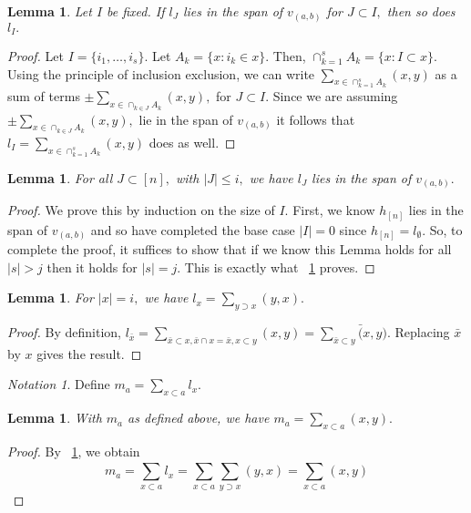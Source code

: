 \documentclass[10 pt]{amsart}
\theoremstyle{plain}
\newtheorem{lem}[thm]{Lemma}
\theoremstyle{definition}
\theoremstyle{remark}
\newtheorem{note}[thm]{Notation}
\numberwithin{equation}{section}
\begin{document}
\begin{lem}
\label{l_induction_step}
Let $I$ be fixed. If $l_J$ lies in the span of $v_{(a, b)}$ for $J \subset I,$ then so does $l_I.$

\end{lem}
\begin{proof}
Let $I = \{i_1,\ldots, i_s\}.$ Let $A_k = \{x \colon i_k \in x\}.$ Then, $\cap_{k=1}^s A_k = \{x \colon I \subset x\}.$ Using the principle of inclusion exclusion, we can write $\sum_{x \in\cap_{k=1}^s A_k} (x, y)$ as a sum of terms $\pm \sum_{x \in\cap_{k \in J} A_k} (x, y),$ for $J \subset I.$ Since we are assuming $\pm \sum_{x \in\cap_{k \in J} A_k} (x, y),$ lie in the span of $v_{(a, b)}$ it follows that $l_I = \sum_{x \in\cap_{k=1}^s A_k} (x, y)$ does as well.

\end{proof}

\begin{lem}
For all $J \subset [n],$ with $|J| \leq i,$ we have $l_{J}$ lies in the span of $v_{(a , b)}.$ 
\end{lem}
\begin{proof}
We prove this by induction on the size of $I.$ First, we know $h_{[n]}$ lies in the span of $v_{(a, b)}$ and so have completed the base case $|I| = 0$ since $h_{[n]} = l_{\emptyset}.$ So, to complete the proof, it suffices to show that if we know this Lemma holds for all $|s|>j$ then it holds for $|s| = j.$  This is exactly what ~\ref{l_induction_step} proves.
\end{proof}

\begin{lem}
\label{l_diag_equivalence}
For $|x| = i,$ we have $l_{x} = \sum_{y \supset x}^{}(y, x).$
\end{lem}
\begin{proof}
By definition, $l_{\bar x} = \sum_{\bar x\subset x,\bar x \cap x = \bar x,x\subset y}^{}(x, y) = \sum_{\bar x\subset y}^{}\bar (x, y).$ Replacing $\bar x$ by $x$ gives the result.
\end{proof}

\begin{note}
Define $m_a = \sum_{x \subset a}^{}l_{x}.$
\end{note}

\begin{lem}
\label{m_equivalence}
With $m_a$ as defined above, we have $m_a = \sum_{x\subset a}^{}(x, y).$
\end{lem}
\begin{proof}
By ~\ref{l_diag_equivalence}, we obtain
$$m_a = \sum_{x \subset a}^{}l_{x} = \sum_{x \subset a}^{}\sum_{y \supset x}^{}(y, x)= \sum_{x\subset a}^{}(x, y)$$
\end{proof}
\end{document}
